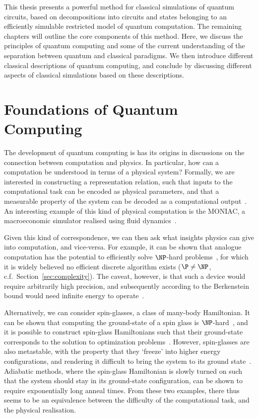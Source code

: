 This thesis presents a powerful method for classical simulations of quantum circuits, based on decompositions into circuits and states belonging to an efficiently simulable restricted model of quantum computation. The remaining chapters will outline the core components of this method. Here, we discuss the principles of quantum computing and some of the current understanding of the separation between quantum and classical paradigms. We then introduce different classical descriptions of quantum computing, and conclude by discussing different aspects of classical simulations based on these descriptions.
\section{Foundations of Quantum Computing}
The development of quantum computing is has its origins in discussions on the connection between computation and physics. In particular, how can a computation be understood in terms of a physical system? Formally, we are interested in constructing a representation relation, such that inputs to the computational task can be encoded as physical parameters, and that a measurable property of the system can be decoded as a computational output~\cite{Horsman2014}. An interesting example of this kind of physical computation is the MONIAC, a macroeconomic simulator realised using fluid dynamics~\cite{Bissell2007}.\par
Given this kind of correspondence, we can then ask what insights physics can give into computation, and vice-versa. For example, it can be shown that analogue computation has the potential to efficiently solve $\NP$-hard problems~\cite{Schonhage1979}, for which it is widely believed no efficient discrete algorithm exists ($\P \neq \NP$, c.f.\ Section~\ref{sec:complexity}). The caveat, however, is that such a device would require arbitrarily high precision, and subsequently according to the Berkenstein bound would need infinite energy to operate~\cite{Aaronson2005}.\par
Alternatively, we can consider spin-glasses, a class of many-body Hamiltonian. It can be shown that computing the ground-state of a spin glass is $\NP$-hard~\cite{Barahona1982}, and it is possible to construct spin-glass Hamiltonians such that their ground-state corresponds to the solution to optimization problems~\cite{Choi2010,Lucas2014}. However, spin-glasses are also metastable, with the property that they `freeze' into higher energy configurations, and rendering it difficult to bring the system to its ground state~\cite{Edwards1975}. Adiabatic methods, where the spin-glass Hamiltonian is slowly turned on such that the system should stay in its ground-state configuration, can be shown to require exponentially long anneal times. From these two examples, there thus seems to be an equivalence between the difficulty of the computational task, and the physical realisation.\par
